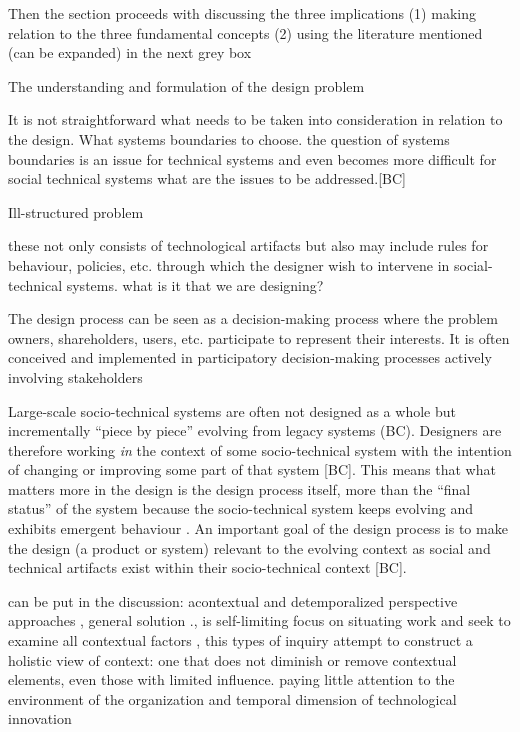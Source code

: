 \begin{svgraybox}

Then the section proceeds with discussing the three implications (1) making relation to the three fundamental concepts (2) using the literature mentioned (can be expanded) in the next grey box 


The understanding and formulation of the design problem 

 It is not straightforward what needs to be taken into consideration in relation to the design. What systems boundaries to choose. the question of systems boundaries is an issue for technical systems and even becomes more difficult for social technical systems
what are the issues to be addressed.[BC]

Ill-structured problem

 these not only consists of technological artifacts but also may include rules for behaviour, policies, etc. through which the designer wish to intervene in social-technical systems. what is it that we are designing? 

 The design process can be seen as a decision-making process where the problem owners, shareholders, users, etc. participate to represent their interests. It is often conceived and implemented in participatory decision-making processes actively involving stakeholders

Large-scale socio-technical systems are often not designed as a whole but incrementally ``piece by piece'' evolving from legacy systems (BC). Designers are therefore working \textit{in} the context of some socio-technical system with the intention of changing or improving some part of that system [BC]. This means that what matters more in the design is the design process itself, more than the ``final status'' of the system \cite{Shin2014, need more ref} because the socio-technical system keeps evolving and exhibits emergent behaviour \cite{Nikolic2009}. An important  goal of the design process is to make the design (a product or system) relevant to the evolving context \cite{Shin2014, need more ref} as social and technical artifacts exist within their socio-technical context [BC]. 

\end{svgraybox}



\begin{svgraybox}
can be put in the discussion: 
acontextual and detemporalized perspective approaches , general solution ., is self-limiting 
focus on situating work and seek to examine all contextual factors , this types of inquiry attempt to construct a holistic view of context: one that does not diminish or remove contextual elements, even those with limited influence. 
paying little attention to the environment of the organization and temporal dimension of technological innovation  \cite{Sawyer2014}
\end{svgraybox}


